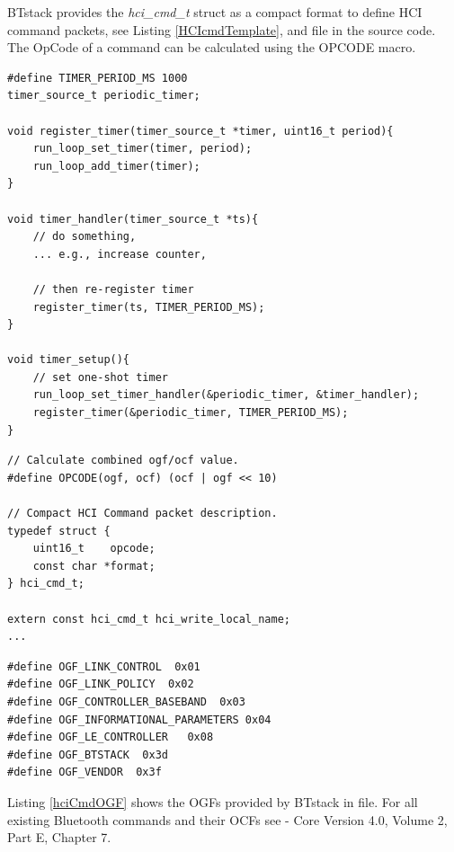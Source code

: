 \documentclass[a4paper,titlepage,oneside,12pt]{amsart} %
\begin{document}
BTstack provides the \emph{hci\_cmd\_t} struct as a compact format to define HCI command packets, see Listing \ref{HCIcmdTemplate},  and  file in the source code. The OpCode of a command can be calculated using the OPCODE macro. 

\begin{lstlisting}[caption=Periodic counter, label=PeriodicTimeHandler]
#define TIMER_PERIOD_MS 1000
timer_source_t periodic_timer;

void register_timer(timer_source_t *timer, uint16_t period){
    run_loop_set_timer(timer, period);
    run_loop_add_timer(timer);
}

void timer_handler(timer_source_t *ts){
    // do something,
    ... e.g., increase counter,
    
    // then re-register timer
    register_timer(ts, TIMER_PERIOD_MS);
} 

void timer_setup(){
    // set one-shot timer
    run_loop_set_timer_handler(&periodic_timer, &timer_handler);
    register_timer(&periodic_timer, TIMER_PERIOD_MS);
}
\end{lstlisting}

\noindent\begin{minipage}{\textwidth}
\begin{lstlisting}[caption = hci\_cmds.h defines HCI command template., label=HCIcmdTemplate]
// Calculate combined ogf/ocf value.
#define OPCODE(ogf, ocf) (ocf | ogf << 10)

// Compact HCI Command packet description.
typedef struct {
    uint16_t    opcode;
    const char *format;
} hci_cmd_t;

extern const hci_cmd_t hci_write_local_name;
...
\end{lstlisting}
\end{minipage}

\begin{lstlisting}[caption=hci.h defines possible OGFs used for creation of a HCI command., label=hciCmdOGF]
#define OGF_LINK_CONTROL  0x01
#define OGF_LINK_POLICY  0x02
#define OGF_CONTROLLER_BASEBAND  0x03
#define OGF_INFORMATIONAL_PARAMETERS 0x04
#define OGF_LE_CONTROLLER   0x08
#define OGF_BTSTACK  0x3d
#define OGF_VENDOR  0x3f
\end{lstlisting}

Listing \ref{hciCmdOGF} shows the OGFs provided by BTstack in  file.  For all existing Bluetooth commands and their OCFs see \BluetoothSpecificationURL{} - Core Version 4.0, Volume 2, Part E, Chapter 7.
\end{document}
